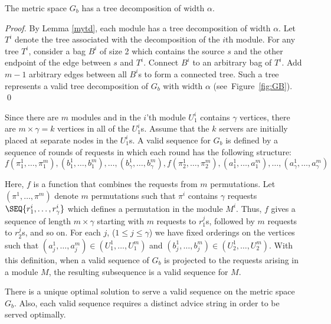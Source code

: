\begin{lemma} \label{lemunlab}
The metric space $G_b$ has a tree decomposition of width $\alpha$.
\end{lemma}

\begin{proof}
By Lemma \ref{mytd}, each module has a tree decomposition of width $\alpha$. Let $T^i$ denote the tree associated with the decomposition of the $i$th module. For any tree $T^i$, consider a bag $B^i$ of 
size 2 which contains the source $s$ and the other endpoint of the edge between $s$ and $T^i$. Connect $B^i$ to an arbitrary bag of $T^i$. Add $m-1$ arbitrary edges between all $B^{i}$s to form a connected tree. Such a tree represents a valid tree decomposition of $G_b$ with width $\alpha$ \mbox{(see Figure \ref{fig:GB}).} \qed
\end{proof}


Since there are $m$ modules and in the $i$'th module $U_1^i$ contains $\gamma$ vertices, there are $m \times \gamma = k$ vertices in all of the $U_1^i$s. Assume that the $k$ servers are initially placed at separate nodes in the $U_1^i$s. A valid sequence for $G_b$ is defined by a sequence of rounds of requests in which each round has the following structure: \\

\footnotesize{\hspace{-.45cm}
$f(\pi_1^1, \ldots ,\pi_1^{m}) , (b_1^1, \ldots , b_1^{m}) , \ldots , (b_\gamma^1, \ldots , b_\gamma^{m}), f(\pi_2^1 , \ldots , \pi_2^{m}) ,
(a_1^1, \ldots , a_1^{m}), \ldots , (a_\gamma^1, \ldots , a_\gamma^{m})$}\\
\normalsize

Here, $f$ is a function that combines the requests from $m$ permutations. Let $(\pi^1, \ldots, \pi^m)$ denote $m$ permutations such that $\pi^i$ 
contains $\gamma$ requests $\SEQ{r^i_1, \ldots, r^i_\gamma}$ which defines a permutation in the module $M^i$. Thus, $f$ gives a sequence of length $ m \times \gamma$ starting with $m$ requests to $r^j_1$s, followed 
by $m$ requests to $r^j_2$s, and so on. For each $j$, ($1 \leq j \leq \gamma$) we have fixed orderings on the vertices such that $(a_{j}^{1}, \ldots, a_{j}^{m}) \in (U_{1}^{1}, \ldots, U_{1}^{m})$ and $(b_{j}^{1}, \ldots, b_{j}^{m}) \in (U_{2}^{1}, \ldots, U_{2}^{m})$. With this definition, when a valid sequence of $G_b$ is projected to the requests arising in a module $M$, the resulting subsequence is a valid sequence for $M$. 

\begin{lemma} \label{khast}
There is a unique optimal solution to serve a valid sequence on the metric space $G_b$. Also, each valid sequence requires a distinct advice string in order to be served optimally.
\end{lemma} 

